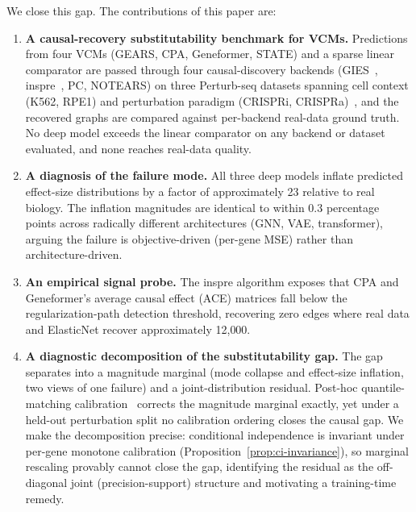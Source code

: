 \documentclass{article}
\theoremstyle{plain}
\theoremstyle{definition}
\theoremstyle{remark}
\begin{document}
We close this gap. The contributions of this paper are:
\begin{enumerate}
\item \textbf{A causal-recovery substitutability benchmark for VCMs.} Predictions from four VCMs (GEARS, CPA, Geneformer, STATE) and a sparse linear comparator are passed through four causal-discovery backends (GIES~\citep{hauser2012gies}, inspre~\citep{brown2025inspre}, PC, NOTEARS) on three Perturb-seq datasets spanning cell context (K562, RPE1) and perturbation paradigm (CRISPRi, CRISPRa)~\citep{replogle2022,norman2019}, and the recovered graphs are compared against per-backend real-data ground truth. No deep model exceeds the linear comparator on any backend or dataset evaluated, and none reaches real-data quality.
\item \textbf{A diagnosis of the failure mode.} All three deep models inflate predicted effect-size distributions by a factor of approximately 23 relative to real biology. The inflation magnitudes are identical to within 0.3 percentage points across radically different architectures (GNN, VAE, transformer), arguing the failure is objective-driven (per-gene MSE) rather than architecture-driven.
\item \textbf{An empirical signal probe.} The inspre algorithm exposes that CPA and Geneformer's average causal effect (ACE) matrices fall below the regularization-path detection threshold, recovering zero edges where real data and ElasticNet recover approximately 12{,}000.
\item \textbf{A diagnostic decomposition of the substitutability gap.} The gap separates into a magnitude marginal (mode collapse and effect-size inflation, two views of one failure) and a joint-distribution residual. Post-hoc quantile-matching calibration~\citep{bolstad2003,reinhard2001} corrects the magnitude marginal exactly, yet under a held-out perturbation split no calibration ordering closes the causal gap. We make the decomposition precise: conditional independence is invariant under per-gene monotone calibration (Proposition~\ref{prop:ci-invariance}), so marginal rescaling provably cannot close the gap, identifying the residual as the off-diagonal joint (precision-support) structure and motivating a training-time remedy.
\end{enumerate}

\end{document}
